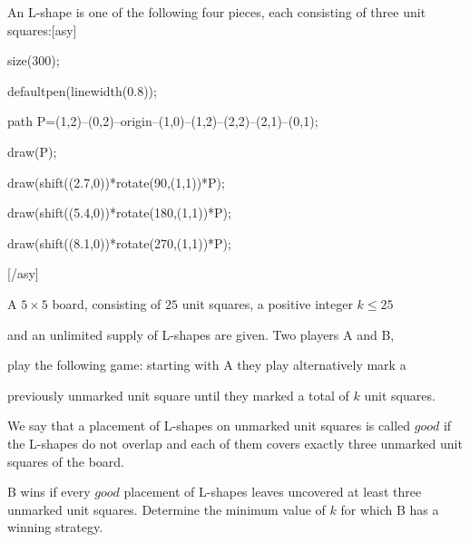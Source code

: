 An L-shape is one of the following four pieces, each consisting of three unit squares:[asy]

size(300);

defaultpen(linewidth(0.8));

path P=(1,2)--(0,2)--origin--(1,0)--(1,2)--(2,2)--(2,1)--(0,1);

draw(P);

draw(shift((2.7,0))*rotate(90,(1,1))*P);

draw(shift((5.4,0))*rotate(180,(1,1))*P);

draw(shift((8.1,0))*rotate(270,(1,1))*P);

[/asy]

A $5\times 5$ board, consisting of $25$ unit squares, a positive integer $k\leq 25$

 and an unlimited supply of L-shapes are given. Two players A and B, 

play the following game: starting with A they play alternatively mark a 

previously unmarked unit square until they marked a total of $k$ unit squares.

We say that a placement of L-shapes on unmarked unit squares is called $\textit{good}$ if the L-shapes do not overlap and each of them covers exactly three unmarked unit squares of the board.

B wins if every $\textit{good}$ placement of L-shapes leaves uncovered at least three unmarked unit squares.  Determine the minimum value of $k$ for which B has a winning strategy.